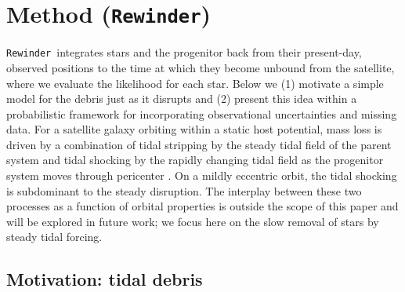 \documentclass{emulateapj}
\newcommand{\rewinder}{\texttt{Rewinder}}
\begin{document}
\section{Method (\rewinder)}\label{sec:method}

\rewinder\ integrates stars and the progenitor back from their present-day, observed positions to the time at which they become unbound from the satellite, where we evaluate the likelihood for each star. Below we (1) motivate a simple model for the debris just as it disrupts and (2) present this idea within a probabilistic framework for incorporating observational uncertainties and missing data. For a satellite galaxy orbiting within a static host potential, mass loss is driven by a combination of tidal stripping by the steady tidal field of the parent system and tidal shocking by the rapidly changing tidal field as the progenitor system moves through pericenter \citep[e.g.,][]{choi09}. On a mildly eccentric orbit, the tidal shocking is subdominant to the steady disruption. The interplay between these two processes as a function of orbital properties is outside the scope of this paper and will be explored in future work; we focus here on the slow removal of stars by steady tidal forcing. 

\subsection{Motivation: tidal debris}\label{sec:debris}
\end{document}
